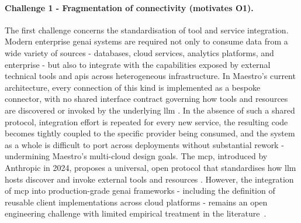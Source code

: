 \paragraph{Challenge 1 - Fragmentation of connectivity (motivates O1).}
The first challenge concerns the standardisation of tool and service integration. Modern enterprise \gls{genai} systems are required not only to consume data from a wide variety of sources - databases, cloud services, analytics platforms, and enterprise  - but also to integrate with the capabilities exposed by external technical tools and \glspl{api} across heterogeneous infrastructure. In Maestro's current architecture, every connection of this kind is implemented as a bespoke connector, with no shared interface contract governing how tools and resources are discovered or invoked by the underlying \gls{llm} \cite{closer2025maestro}. In the absence of such a shared protocol, integration effort is repeated for every new service, the resulting code becomes tightly coupled to the specific provider being consumed, and the system as a whole is difficult to port across deployments without substantial rework - undermining Maestro's multi-cloud design goals. The \gls{mcp}, introduced by Anthropic in 2024, proposes a universal, open protocol that standardises how \gls{llm} hosts discover and invoke external tools and resources \cite{anthropic2024mcp, modelcontextprotocol2024}. However, the integration of \gls{mcp} into production-grade \gls{genai} frameworks - including the definition of reusable client implementations across cloud platforms - remains an open engineering challenge with limited empirical treatment in the literature~\cite{thoughtworks_radar_2025,ieee_mcp_healthcare_2025}.

